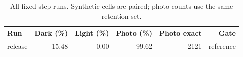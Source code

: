 \begingroup\small
\setlength{\tabcolsep}{4pt}
\begin{table}[htbp]\centering
\caption{All fixed-step runs. Synthetic cells are paired; photo counts use the same retention set.}\label{tab:adaptation}
\begin{tabular}{lrrrrr}
\toprule
Run & %
Dark (\%) & %
Light (\%) & %
Photo (\%) & %
Photo exact & %
Gate \\ %
\midrule

release & %
15.48 & %
0.00 & %
99.62 & %
2121 & %
reference \\ %


\end{tabular}
\end{table}
